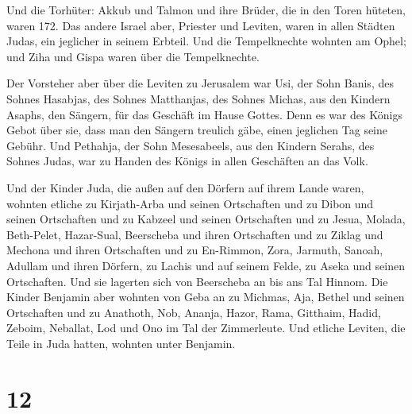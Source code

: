  Und die Torhüter: Akkub und Talmon und ihre Brüder, die
in den Toren hüteten, waren 172.  Das andere Israel aber,
Priester und Leviten, waren in allen Städten Judas, ein jeglicher in
seinem Erbteil.  Und die Tempelknechte wohnten am Ophel;
und Ziha und Gispa waren über die Tempelknechte.

 Der Vorsteher aber über die Leviten zu Jerusalem war
Usi, der Sohn Banis, des Sohnes Hasabjas, des Sohnes Matthanjas, des
Sohnes Michas, aus den Kindern Asaphs, den Sängern, für das Geschäft im
Hause Gottes.  Denn es war des Königs Gebot über sie,
dass man den Sängern treulich gäbe, einen jeglichen Tag seine Gebühr.
 Und Pethahja, der Sohn Mesesabeels, aus den Kindern
Serahs, des Sohnes Judas, war zu Handen des Königs in allen Geschäften
an das Volk.

 Und der Kinder Juda, die außen auf den Dörfern auf ihrem
Lande waren, wohnten etliche zu Kirjath-Arba und seinen Ortschaften und
zu Dibon und seinen Ortschaften und zu Kabzeel und seinen Ortschaften
 und zu Jesua, Molada, Beth-Pelet, 
Hazar-Sual, Beerscheba und ihren Ortschaften  und zu
Ziklag und Mechona und ihren Ortschaften  und zu
En-Rimmon, Zora, Jarmuth,  Sanoah, Adullam und ihren
Dörfern, zu Lachis und auf seinem Felde, zu Aseka und seinen
Ortschaften. Und sie lagerten sich von Beerscheba an bis ans Tal Hinnom.
 Die Kinder Benjamin aber wohnten von Geba an zu Michmas,
Aja, Bethel und seinen Ortschaften  und zu Anathoth, Nob,
Ananja,  Hazor, Rama, Gitthaim,  Hadid,
Zeboim, Neballat,  Lod und Ono im Tal der Zimmerleute.
 Und etliche Leviten, die Teile in Juda hatten, wohnten
unter Benjamin.

\hypertarget{section-11}{%
\section{12}\label{section-11}}

